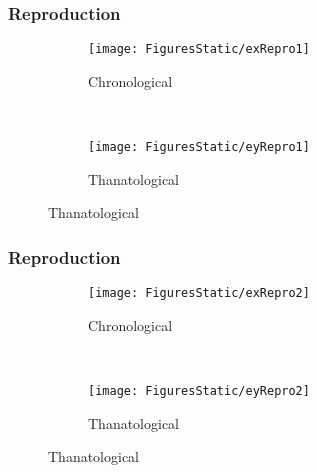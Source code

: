 \documentclass{beamer}
\begin{document}
\begin{frame}
\frametitle{Reproduction}
\vspace{-5em}
\begin{figure}
        \centering
        \begin{subfigure}[b]{0.5\textwidth}
                \centering
                \caption*{Chronological}
                \texttt{[image: FiguresStatic/exRepro1]}
        \end{subfigure}%
        ~ %
        \begin{subfigure}[b]{0.5\textwidth}
                \centering
                \caption*{Thanatological}
                \texttt{[image: FiguresStatic/eyRepro1]}
        \end{subfigure}
\end{figure}
\end{frame}

\begin{frame}
\frametitle{Reproduction}
\vspace{-5em}
\begin{figure}
        \centering
        \begin{subfigure}[b]{0.5\textwidth}
                \centering
                \caption*{Chronological}
                \texttt{[image: FiguresStatic/exRepro2]}
        \end{subfigure}%
        ~ %
        \begin{subfigure}[b]{0.5\textwidth}
                \centering
                \caption*{Thanatological}
                \texttt{[image: FiguresStatic/eyRepro2]}
        \end{subfigure}
\end{figure}
\end{frame}
\end{document}
